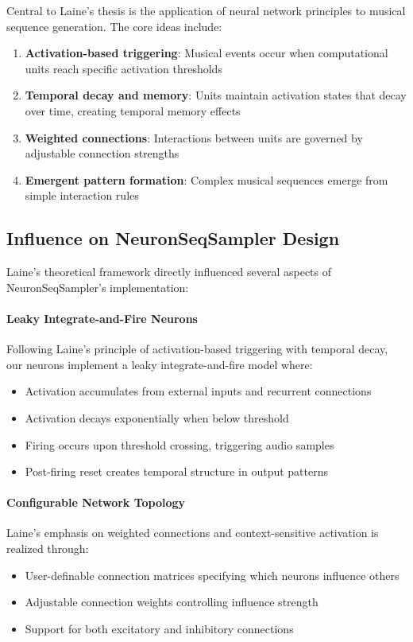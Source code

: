 \documentclass[11pt,a4paper]{article}
\begin{document}
Central to Laine's thesis is the application of neural network principles to musical sequence generation. The core ideas include:

\begin{enumerate}
\item \textbf{Activation-based triggering}: Musical events occur when computational units reach specific activation thresholds
\item \textbf{Temporal decay and memory}: Units maintain activation states that decay over time, creating temporal memory effects
\item \textbf{Weighted connections}: Interactions between units are governed by adjustable connection strengths
\item \textbf{Emergent pattern formation}: Complex musical sequences emerge from simple interaction rules
\end{enumerate}

\subsection{Influence on NeuronSeqSampler Design}

Laine's theoretical framework directly influenced several aspects of NeuronSeqSampler's implementation:

\paragraph{Leaky Integrate-and-Fire Neurons}
Following Laine's principle of activation-based triggering with temporal decay, our neurons implement a leaky integrate-and-fire model where:
\begin{itemize}
\item Activation accumulates from external inputs and recurrent connections
\item Activation decays exponentially when below threshold
\item Firing occurs upon threshold crossing, triggering audio samples
\item Post-firing reset creates temporal structure in output patterns
\end{itemize}

\paragraph{Configurable Network Topology}
Laine's emphasis on weighted connections and context-sensitive activation is realized through:
\begin{itemize}
\item User-definable connection matrices specifying which neurons influence others
\item Adjustable connection weights controlling influence strength
\item Support for both excitatory and inhibitory connections
\end{itemize}
\end{document}
